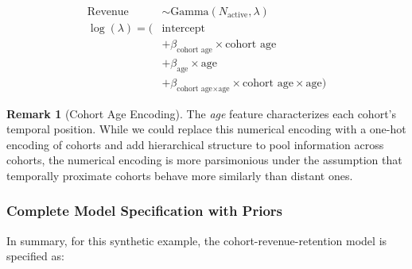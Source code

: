 \documentclass[11pt]{amsart}
\theoremstyle{definition}
\newtheorem{remark}{Remark}
\begin{document}
\begin{align*}
    \text{Revenue}    & \sim \text{Gamma}(N_{\text{active}}, \lambda)                                             \\
    \log(\lambda) = ( & \text{intercept}                                                                          \\
                      & + \beta_{\text{cohort age}} \times \text{cohort age}                                      \\
                      & + \beta_{\text{age}} \times \text{age}                                                    \\
                      & + \beta_{\text{cohort age} \times \text{age}} \times \text{cohort age} \times \text{age})
\end{align*}

\begin{remark}[Cohort Age Encoding]
    The {\em age} feature characterizes each cohort's temporal position. While we could replace this numerical encoding with
    a one-hot encoding of cohorts and add hierarchical structure to pool information across cohorts, the numerical encoding
    is more parsimonious under the assumption that temporally proximate cohorts behave more similarly than distant ones.
\end{remark}

\subsubsection{Complete Model Specification with Priors}

In summary, for this synthetic example, the cohort-revenue-retention model is specified as:
\end{document}
